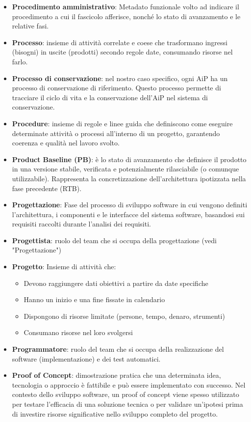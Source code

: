 \documentclass[a4paper,12pt]{article}
\begin{document}
\begin{itemize}
    \item \textbf{Procedimento amministrativo}: Metadato funzionale volto ad indicare il procedimento a cui il fascicolo afferisce, nonché lo stato di avanzamento e le relative fasi.
    \item \textbf{Processo}: insieme di attività correlate e coese che trasformano ingressi (bisogni) in uscite (prodotti) secondo regole date, consumando risorse nel farlo.
    \item \textbf{Processo di conservazione}: nel nostro caso specifico, ogni AiP ha un processo di conservazione di riferimento. Questo processo permette di tracciare il ciclo di vita e la conservazione dell'AiP nel sistema di conservazione.
    \item \textbf{Procedure}: insieme di regole e linee guida che definiscono come eseguire determinate attività o processi all'interno di un progetto, garantendo coerenza e qualità nel lavoro svolto.
    \item \textbf{Product Baseline (PB)}: è lo stato di avanzamento che definisce il prodotto in una versione stabile, verificata e potenzialmente rilasciabile (o comunque utilizzabile). Rappresenta la concretizzazione dell'architettura ipotizzata nella fase precedente (RTB).
    \item \textbf{Progettazione}: Fase del processo di sviluppo software in cui vengono definiti l'architettura, i componenti e le interfacce del sistema software, basandosi sui requisiti raccolti durante l'analisi dei requisiti.
    \item \textbf{Progettista}: ruolo del team che si occupa della progettazione (vedi "Progettazione")
    \item \textbf{Progetto}: Insieme di attività che:
    \begin{itemize}
        \item Devono raggiungere dati obiettivi a partire da date specifiche
        \item Hanno un inizio e una fine fissate in calendario
        \item Dispongono di risorse limitate (persone, tempo, denaro, strumenti)
        \item Consumano risorse nel loro svolgersi
    \end{itemize}
    \item \textbf{Programmatore}: ruolo del team che si occupa della realizzazione del software (implementazione) e dei test automatici.
    \item \textbf{Proof of Concept}: dimostrazione pratica che una determinata idea, tecnologia o approccio è fattibile e può essere implementato con successo. Nel contesto dello sviluppo software, un proof of concept viene spesso utilizzato per testare l'efficacia di una soluzione tecnica o per validare un'ipotesi prima di investire risorse significative nello sviluppo completo del progetto.

\end{itemize}
\end{document}
